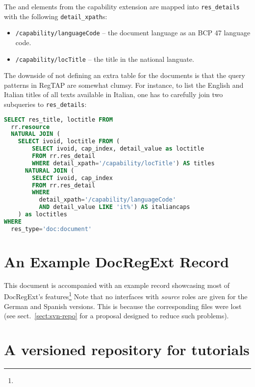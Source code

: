 \documentclass{ivoa}
\begin{document}
The  and  elements from the
 capability extension are mapped into
\verb|res_details| with the following \verb|detail_xpath|s:

\begin{itemize}

\item \texttt{/capability/languageCode} -- the document language as an
BCP 47 \citep{std:BCP47} language code.
\item \texttt{/capability/locTitle} -- the title in the national
languate.
\end{itemize}

The downside of not defining an extra table for the documents is that
the query patterns in RegTAP are somewhat clumsy.  For instance, to list
the English and Italian titles of all texts available in Italian, one
has to carefully join two subqueries to \verb|res_details|:

\begin{lstlisting}[language=SQL]
SELECT res_title, loctitle FROM
  rr.resource
  NATURAL JOIN (
    SELECT ivoid, loctitle FROM (
        SELECT ivoid, cap_index, detail_value as loctitle
        FROM rr.res_detail
        WHERE detail_xpath='/capability/locTitle') AS titles
      NATURAL JOIN (
        SELECT ivoid, cap_index
        FROM rr.res_detail
        WHERE
          detail_xpath='/capability/languageCode'
          AND detail_value LIKE 'it%') AS italiancaps
    ) as loctitles
WHERE
  res_type='doc:document'
\end{lstlisting}


\appendix

\section{An Example DocRegExt Record}

This document is accompanied with an example record showcasing most of
DocRegExt's features\footnote{}
Note that no interfaces with \textit{source} roles
are given for the German and Spanish versions.  This is because the
corresponding files were lost (see sect.~\ref{sect:svn-repo} for a
proposal designed to reduce such problems).


\section{A versioned repository for tutorials}
\end{document}

